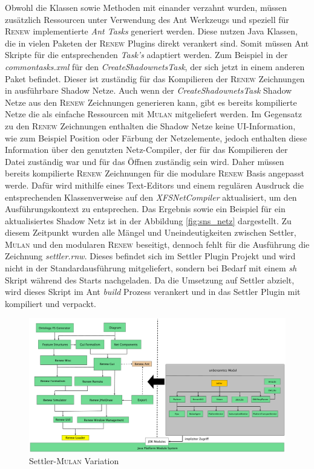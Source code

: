 	Obwohl die Klassen sowie Methoden mit einander verzahnt wurden, müssen zusätzlich Ressourcen unter Verwendung des Ant Werkzeugs und speziell für \textsc{Renew} implementierte \textit{Ant Tasks} generiert werden. Diese nutzen Java Klassen, die in vielen Paketen der \textsc{Renew} Plugins direkt verankert sind. Somit müssen Ant Skripte für die entsprechenden \textit{Task's} adaptiert werden. Zum Beispiel in der \textit{commontasks.xml} für den \textit{CreateShadownetsTask}, der sich jetzt in einem anderen Paket befindet. Dieser ist zuständig für das Kompilieren der \textsc{Renew} Zeichnungen in ausführbare Shadow Netze. Auch wenn der \textit{CreateShadownetsTask} Shadow Netze aus den \textsc{Renew} Zeichnungen generieren kann, gibt es bereits kompilierte Netze die als einfache Ressourcen mit \textsc{Mulan} mitgeliefert werden. \newline
	Im Gegensatz zu den \textsc{Renew} Zeichnungen enthalten die Shadow Netze keine UI-Information, wie zum Beispiel Position oder Färbung der Netzelemente, jedoch enthalten diese Information über den genutzten Netz-Compiler, der für das Kompilieren der Datei zuständig war und für das Öffnen zuständig sein wird. Daher müssen bereits kompilierte \textsc{Renew} Zeichnungen für die modulare \textsc{Renew} Basis angepasst werde. Dafür wird mithilfe eines Text-Editors und einem regulären Ausdruck die entsprechenden Klassenverweise auf den \textit{XFSNetCompiler} aktualisiert, um den Ausführungskontext zu entsprechen. \newline
	Das Ergebnis sowie ein Beispiel für ein aktualisiertes Shadow Netz ist in der Abbildung \ref{fig:sns_netz} dargestellt. \bigbreak
	Zu diesem Zeitpunkt wurden alle Mängel und Uneindeutigkeiten zwischen Settler, \textsc{Mulan} und den modularen \textsc{Renew} beseitigt, dennoch fehlt für die Ausführung die Zeichnung \textit{settler.rnw}. Dieses befindet sich im Settler Plugin Projekt und wird nicht in der Standardausführung mitgeliefert, sondern bei Bedarf mit einem \textit{sh} Skript während des Starts nachgeladen. \newline
	Da die Umsetzung auf Settler abzielt, wird dieses Skript im Ant \textit{build} Prozess verankert und in das Settler Plugin mit kompiliert und verpackt. \newline

	\begin{figure}[h!]
	  \centering
	  \includegraphics[width=\textwidth]{material/images/settler-renew-mulan-vm.pdf}
	  \caption{Settler-\textsc{Mulan} Variation}
	  \label{fig:trans_config}
	\end{figure}

